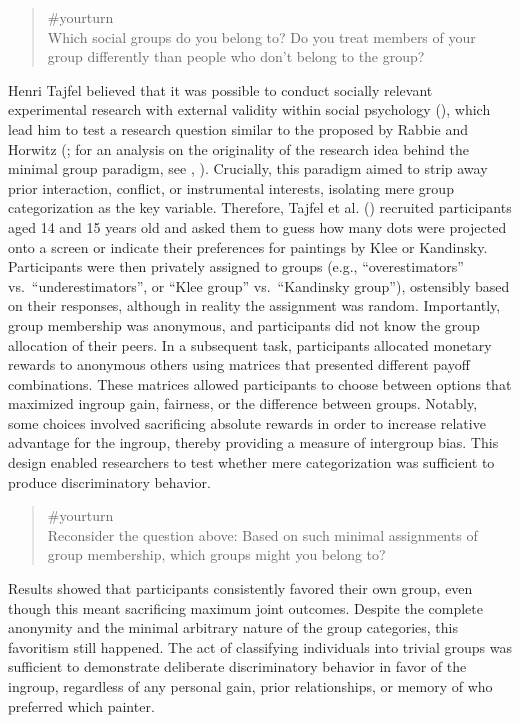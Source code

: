 \documentclass[
  letterpaper,
]{book}
\begin{document}
\begin{quote}
{\#yourturn}\\
Which social groups do you belong to? Do you treat members of your group
differently than people who don't belong to the group?
\end{quote}

Henri Tajfel believed that it was possible to conduct socially relevant
experimental research with external validity within social psychology
(), which lead him to test a
research question similar to the proposed by Rabbie and Horwitz
(; for an
analysis on the originality of the research idea behind the minimal
group paradigm, see ,
). Crucially, this paradigm aimed
to strip away prior interaction, conflict, or instrumental interests,
isolating mere group categorization as the key variable. Therefore,
Tajfel et al. () recruited
participants aged 14 and 15 years old and asked them to guess how many
dots were projected onto a screen or indicate their preferences for
paintings by Klee or Kandinsky. Participants were then privately
assigned to groups (e.g., ``overestimators'' vs.~``underestimators'', or
``Klee group'' vs.~``Kandinsky group''), ostensibly based on their
responses, although in reality the assignment was random. Importantly,
group membership was anonymous, and participants did not know the group
allocation of their peers. In a subsequent task, participants allocated
monetary rewards to anonymous others using matrices that presented
different payoff combinations. These matrices allowed participants to
choose between options that maximized ingroup gain, fairness, or the
difference between groups. Notably, some choices involved sacrificing
absolute rewards in order to increase relative advantage for the
ingroup, thereby providing a measure of intergroup bias. This design
enabled researchers to test whether mere categorization was sufficient
to produce discriminatory behavior.

\begin{quote}
{\#yourturn}\\
Reconsider the question above: Based on such minimal assignments of
group membership, which groups might you belong to?
\end{quote}

Results showed that participants consistently favored their own group,
even though this meant sacrificing maximum joint outcomes. Despite the
complete anonymity and the minimal arbitrary nature of the group
categories, this favoritism still happened. The act of classifying
individuals into trivial groups was sufficient to demonstrate deliberate
discriminatory behavior in favor of the ingroup, regardless of any
personal gain, prior relationships, or memory of who preferred which
painter.
\end{document}
